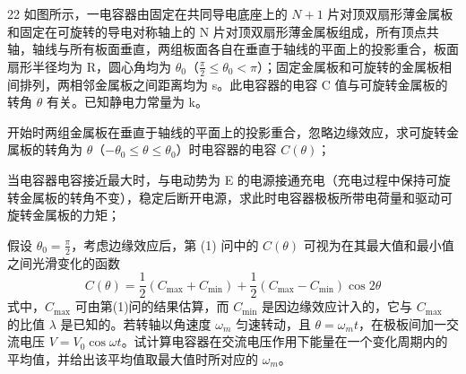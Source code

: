 \begin{problem}[第31届全国中学生物理竞赛复赛][电容器与旋转金属板]{22}
如图所示，一电容器由固定在共同导电底座上的 $N+1$ 片对顶双扇形薄金属板和固定在可旋转的导电对称轴上的 N 片对顶双扇形薄金属板组成，所有顶点共轴，轴线与所有板面垂直，两组板面各自在垂直于轴线的平面上的投影重合，板面扇形半径均为 R，圆心角均为 $\theta_0$（$\frac{\pi}{2}\leq\theta_0<\pi$）；固定金属板和可旋转的金属板相间排列，两相邻金属板之间距离均为 s。此电容器的电容 C 值与可旋转金属板的转角 $\theta$ 有关。已知静电力常量为 k。
    \begin{subproblem}
        开始时两组金属板在垂直于轴线的平面上的投影重合，忽略边缘效应，求可旋转金属板的转角为 $\theta$（$-\theta_0 \leq \theta \leq \theta_0$）时电容器的电容 $C(\theta)$；
    \end{subproblem}
    \begin{subproblem}
        当电容器电容接近最大时，与电动势为 E 的电源接通充电（充电过程中保持可旋转金属板的转角不变），稳定后断开电源，求此时电容器极板所带电荷量和驱动可旋转金属板的力矩；
    \end{subproblem}
    \begin{subproblem}
        假设 $\theta_0 = \frac{\pi}{2}$，考虑边缘效应后，第 (1) 问中的 $C(\theta)$ 可视为在其最大值和最小值之间光滑变化的函数
        \begin{equation*}
            C(\theta) = \frac{1}{2}(C_{\max} + C_{\min}) + \frac{1}{2}(C_{\max} - C_{\min})\cos 2\theta
        \end{equation*}
        式中，$C_{\max}$ 可由第(1)问的结果估算，而 $C_{\min}$ 是因边缘效应计入的，它与 $C_{\max}$ 的比值 $\lambda$ 是已知的。若转轴以角速度 $\omega_m$ 匀速转动，且 $\theta = \omega_m t$，在极板间加一交流电压 $V = V_0 \cos \omega t$。试计算电容器在交流电压作用下能量在一个变化周期内的平均值，并给出该平均值取最大值时所对应的 $\omega_m$。
    \end{subproblem}
\end{problem}